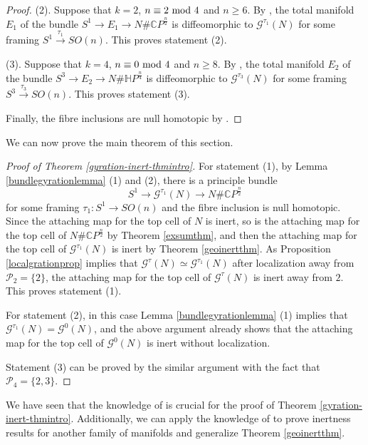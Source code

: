 \documentclass[a4]{amsart}
\theoremstyle{definition}
\begin{document}
\begin{sloppypar}
\begin{proof}
(2). Suppose that $k=2$, $n\equiv 2~{\rm mod}~4$ and $n\geq 6$. 
By \cite[Corollary 3.3]{HT23}, the total manifold $E_1$ of the bundle $S^1\stackrel{}{\longrightarrow} E_1\stackrel{}{\longrightarrow} N\# \mathbb{C}P^{\frac{n}{2}}$ is diffeomorphic to $\mathcal{G}^{\tau_1}(N)$ for some framing $S^1\stackrel{\tau_1}{\longrightarrow} SO(n)$. This proves statement (2).

(3). Suppose that $k=4$, $n\equiv 0~{\rm mod}~4$ and $n\geq 8$. 
By \cite[Corollary 3.3]{HT23}, the total manifold $E_2$ of the bundle $S^3\stackrel{}{\longrightarrow} E_2\stackrel{}{\longrightarrow}N\# \mathbb{H}P^{\frac{n}{4}}$ is diffeomorphic to $\mathcal{G}^{\tau_3}(N)$ for some framing $S^3\stackrel{\tau_3}{\longrightarrow} SO(n)$. This proves statement (3).

Finally, the fibre inclusions are null homotopic by \cite[Lemma 3.1]{HT23}.
\end{proof}

We can now prove the main theorem of this section.

\begin{proof}[Proof of Theorem \ref{gyration-inert-thmintro}]
For statement (1), by Lemma \ref{bundlegyrationlemma} (1) and (2), there is a principle bundle
\[
S^1\stackrel{}{\longrightarrow} \mathcal{G}^{\tau_1}(N) \stackrel{}{\longrightarrow} N\# \mathbb{C}P^{\frac{n}{2}}
\]
for some framing $\tau_1: S^1\stackrel{}{\longrightarrow} SO(n)$ and the fibre inclusion is null homotopic. Since the attaching map for the top cell of $N$ is inert, so is the attaching map for the top cell of $ N\# \mathbb{C}P^{\frac{n}{2}}$ by Theorem \ref{exsumthm}, and then the attaching map for the top cell of $\mathcal{G}^{\tau_1}(N)$ is inert by Theorem \ref{geoinertthm}. 
As Proposition \ref{localgrationprop} implies that $\mathcal{G}^{\tau}(N)\simeq \mathcal{G}^{\tau_1}(N)$ after localization away from $\mathcal{P}_2=\{2\}$, the attaching map for the top cell of $\mathcal{G}^{\tau}(N)$ is inert away from $2$. This proves statement (1).

For statement (2), in this case Lemma \ref{bundlegyrationlemma} (1) implies that $\mathcal{G}^{\tau_1}(N)=\mathcal{G}^{0}(N)$, and the above argument already shows that the attaching map for the top cell of $\mathcal{G}^{0}(N)$ is inert without localization. 

Statement (3) can be proved by the similar argument with the fact that $\mathcal{P}_4=\{2, 3\}$. 
\end{proof}

We have seen that the knowledge of \cite[Section 3]{HT23} is crucial for the proof of Theorem \ref{gyration-inert-thmintro}. Additionally, we can apply the knowledge of \cite[Section 3]{HT23} to prove inertness results for another family of manifolds and generalize Theorem \ref{geoinertthm}. 


\end{sloppypar}
\end{document}
